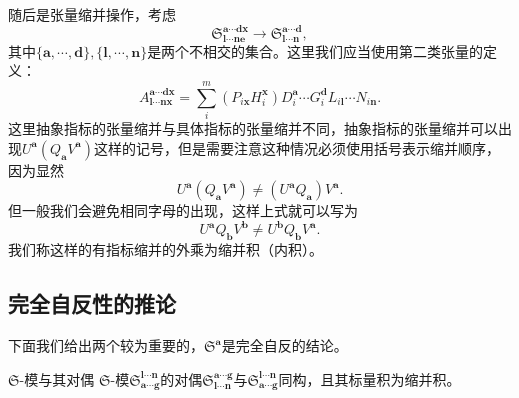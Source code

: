 随后是张量缩并操作，考虑
\begin{equation*}
	\mathfrak{S}_{\boldsymbol{l} \cdots \boldsymbol{ne}}^{\boldsymbol{a} \cdots \boldsymbol{dx}}\rightarrow \mathfrak{S}_{\boldsymbol{l} \cdots \boldsymbol{n}}^{\boldsymbol{a} \cdots \boldsymbol{d}} ,
\end{equation*}
其中$\{\boldsymbol{a} ,\cdots ,\boldsymbol{d}\} ,\{\boldsymbol{l} ,\cdots ,\boldsymbol{n}\}$是两个不相交的集合。这里我们应当使用第二类张量的定义：
\begin{equation*}
	A_{\boldsymbol{l} \cdots \boldsymbol{nx}}^{\boldsymbol{a} \cdots \boldsymbol{dx}} =\sum _{i}^{m} (P_{i\boldsymbol{x}} H_{i}^{\boldsymbol{x}} )D_{i}^{\boldsymbol{a}} \cdots G_{i}^{\boldsymbol{d}} L_{i\boldsymbol{l}} \cdots N_{i\boldsymbol{n}} .
\end{equation*}
这里抽象指标的张量缩并与具体指标的张量缩并不同，抽象指标的张量缩并可以出现$U^{\boldsymbol{a}} (Q_{\boldsymbol{a}} V^{\boldsymbol{a}} )$这样的记号，但是需要注意这种情况必须使用括号表示缩并顺序，因为显然
\begin{equation*}
	U^{\boldsymbol{a}} (Q_{\boldsymbol{a}} V^{\boldsymbol{a}} )\neq (U^{\boldsymbol{a}} Q_{\boldsymbol{a}} )V^{\boldsymbol{a}} .
\end{equation*}
但一般我们会避免相同字母的出现，这样上式就可以写为
\begin{equation*}
	U^{\boldsymbol{a}} Q_{\boldsymbol{b}} V^{\boldsymbol{b}} \neq U^{\boldsymbol{b}} Q_{\boldsymbol{b}} V^{\boldsymbol{a}} .
\end{equation*}
我们称这样的有指标缩并的外乘为缩并积（内积）。
\subsection{完全自反性的推论}

下面我们给出两个较为重要的，$\mathfrak{S}^{\boldsymbol{a}}$是完全自反的结论。

\begin{them}[label={them:fras and its dual}]{$\mathfrak{S}$-模与其对偶}
	$\mathfrak{S}$-模$\mathfrak{S}_{\boldsymbol{a} \cdots \boldsymbol{g}}^{\boldsymbol{l} \cdots \boldsymbol{n}}$的对偶$\mathfrak{S}_{\boldsymbol{l} \cdots \boldsymbol{n}}^{\boldsymbol{a} \cdots \boldsymbol{g}}$与$\mathfrak{S}_{\boldsymbol{a} \cdots \boldsymbol{g}}^{\boldsymbol{l} \cdots \boldsymbol{n}}$同构，且其标量积为缩并积。
\end{them}

